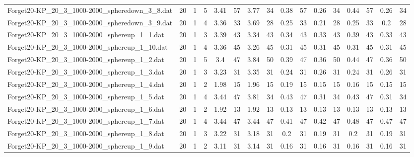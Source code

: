 \begin{sidewaystable}[!ht]
{\begin{tabular}{lccccccccccccccc}
Forget20-KP\_20\_3\_1000-2000\_spheredown\_3\_8.dat & 20 & 1 & 5 & 3.41 & 57 & 3.77 & 34 & 0.38 & 57 &  \textcolor{blue2}{0.26} & 34 & 0.44 & 57 &  \textcolor{blue2}{0.26} & 34 \\
Forget20-KP\_20\_3\_1000-2000\_spheredown\_3\_9.dat & 20 & 1 & 4 & 3.36 & 33 & 3.69 & 28 & 0.25 & 33 & 0.21 & 28 & 0.25 & 33 &  \textcolor{blue2}{0.2} & 28 \\
Forget20-KP\_20\_3\_1000-2000\_sphereup\_1\_1.dat & 20 & 1 & 3 & 3.39 & 43 & 3.34 & 43 & 0.34 & 43 &  \textcolor{blue2}{0.33} & 43 & 0.39 & 43 &  \textcolor{blue2}{0.33} & 43 \\
Forget20-KP\_20\_3\_1000-2000\_sphereup\_1\_10.dat & 20 & 1 & 4 & 3.36 & 45 & 3.26 & 45 &  \textcolor{blue2}{0.31} & 45 &  \textcolor{blue2}{0.31} & 45 &  \textcolor{blue2}{0.31} & 45 &  \textcolor{blue2}{0.31} & 45 \\
Forget20-KP\_20\_3\_1000-2000\_sphereup\_1\_2.dat & 20 & 1 & 5 & 3.4 & 47 & 3.84 & 50 & 0.39 & 47 &  \textcolor{blue2}{0.36} & 50 & 0.44 & 47 &  \textcolor{blue2}{0.36} & 50 \\
Forget20-KP\_20\_3\_1000-2000\_sphereup\_1\_3.dat & 20 & 1 & 3 & 3.23 & 31 & 3.35 & 31 &  \textcolor{blue2}{0.24} & 31 & 0.26 & 31 &  \textcolor{blue2}{0.24} & 31 & 0.26 & 31 \\
Forget20-KP\_20\_3\_1000-2000\_sphereup\_1\_4.dat & 20 & 1 & 2 & 1.98 & 15 & 1.96 & 15 & 0.19 & 15 &  \textcolor{blue2}{0.15} & 15 & 0.16 & 15 &  \textcolor{blue2}{0.15} & 15 \\
Forget20-KP\_20\_3\_1000-2000\_sphereup\_1\_5.dat & 20 & 1 & 4 & 3.44 & 47 & 3.81 & 34 & 0.43 & 47 &  \textcolor{blue2}{0.31} & 34 & 0.43 & 47 &  \textcolor{blue2}{0.31} & 34 \\
Forget20-KP\_20\_3\_1000-2000\_sphereup\_1\_6.dat & 20 & 1 & 2 & 1.92 & 13 & 1.92 & 13 &  \textcolor{blue2}{0.13} & 13 &  \textcolor{blue2}{0.13} & 13 &  \textcolor{blue2}{0.13} & 13 &  \textcolor{blue2}{0.13} & 13 \\
Forget20-KP\_20\_3\_1000-2000\_sphereup\_1\_7.dat & 20 & 1 & 4 & 3.44 & 47 & 3.44 & 47 &  \textcolor{blue2}{0.41} & 47 & 0.42 & 47 & 0.48 & 47 & 0.47 & 47 \\
Forget20-KP\_20\_3\_1000-2000\_sphereup\_1\_8.dat & 20 & 1 & 3 & 3.22 & 31 & 3.18 & 31 & 0.2 & 31 &  \textcolor{blue2}{0.19} & 31 & 0.2 & 31 &  \textcolor{blue2}{0.19} & 31 \\
Forget20-KP\_20\_3\_1000-2000\_sphereup\_1\_9.dat & 20 & 1 & 2 & 3.11 & 31 & 3.14 & 31 &  \textcolor{blue2}{0.16} & 31 &  \textcolor{blue2}{0.16} & 31 &  \textcolor{blue2}{0.16} & 31 &  \textcolor{blue2}{0.16} & 31 \\

\end{tabular}}
\end{sidewaystable}
